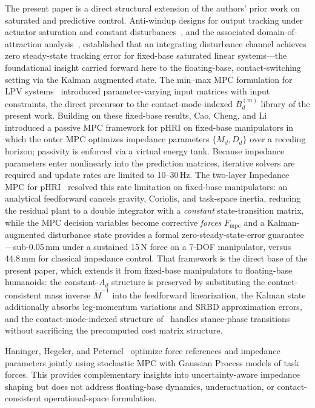 \documentclass[journal]{IEEEtran}
\newcommand{\Mbar}{\bar{M}^{-1}}
\newcommand{\Fmpc}{F_{\text{mpc}}}
\begin{document}
The present paper is a direct structural extension of the authors' prior
work on saturated and predictive control.
Anti-windup designs for output tracking under actuator saturation and
constant disturbances~\cite{cao2004antiwindup}, and the associated
domain-of-attraction analysis~\cite{cao2002antiwindup}, established that an
integrating disturbance channel achieves zero steady-state tracking error
for fixed-base saturated linear systems---the foundational insight carried
forward here to the floating-base, contact-switching setting via the Kalman
augmented state.
The min--max MPC formulation for LPV systems~\cite{cao2005minmax} introduced
parameter-varying input matrices with input constraints, the direct
precursor to the contact-mode-indexed $B_d^{(m)}$ library of the present
work.
Building on these fixed-base results, Cao, Cheng, and
Li~\cite{cao2023passive} introduced a passive MPC framework for pHRI on
fixed-base manipulators in which the outer MPC optimizes impedance
parameters $\{M_d,D_d\}$ over a receding horizon; passivity is enforced via
a virtual energy tank.
Because impedance parameters enter nonlinearly into the prediction matrices,
iterative solvers are required and update rates are limited to 10--30\,Hz.
The two-layer Impedance MPC for pHRI~\cite{cao2026impedance} resolved this
rate limitation on fixed-base manipulators: an analytical feedforward
cancels gravity, Coriolis, and task-space inertia, reducing the residual
plant to a double integrator with a \emph{constant} state-transition
matrix, while the MPC decision variables become corrective \emph{forces}
$\Fmpc$ and a Kalman-augmented disturbance state provides a formal
zero-steady-state-error guarantee---sub-0.05\,mm under a sustained 15\,N
force on a 7-DOF manipulator, versus 44.8\,mm for classical impedance
control.
That framework is the direct base of the present paper, which extends it
from fixed-base manipulators to floating-base humanoids: the constant-$A_d$
structure is preserved by substituting the contact-consistent mass inverse
$\Mbar$ into the feedforward linearization, the Kalman state additionally
absorbs leg-momentum variations and SRBD approximation errors, and the
contact-mode-indexed structure of~\cite{cao2005minmax} handles stance-phase
transitions without sacrificing the precomputed cost matrix structure.

Haninger, Hegeler, and Peternel~\cite{haninger2022model} optimize force
references and impedance parameters jointly using stochastic MPC with
Gaussian Process models of task forces.
This provides complementary insights into uncertainty-aware impedance
shaping but does not address floating-base dynamics, underactuation, or
contact-consistent operational-space formulation.
\end{document}

